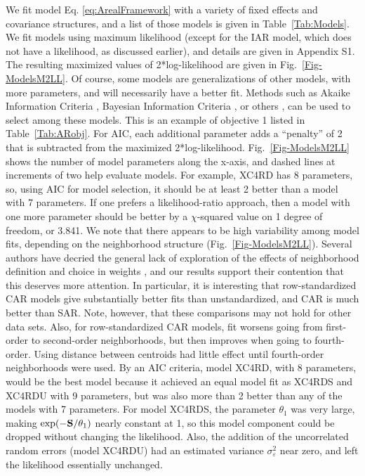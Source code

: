 \documentclass[11pt, titlepage]{article}\usepackage[]{graphicx}\usepackage[]{color}
\begin{document}
\begin{spacing}{1.9}
\begin{flushleft}
We fit model Eq. \ref{eq:ArealFramework} with a variety of fixed effects and covariance structures, and a list of those models is given in Table~\ref{Tab:Models}.  We fit models using maximum likelihood (except for the IAR model, which does not have a likelihood, as discussed earlier), and details are given in Appendix S1. The resulting maximized values of 2*log-likelihood are given in Fig.~\ref{Fig-ModelsM2LL}. Of course, some models are generalizations of other models, with more parameters, and will necessarily have a better fit.  Methods such as Akaike Information Criteria \citep[AIC,][]{Akai:Info:1973}, Bayesian Information Criteria \citep[BIC,][]{Schw:esti:1978}, or others \citep[see, e.g.,][]{Burn:Ande:mode:2002,Hoot:Hobb:guid:2015}, can be used to select among these models. This is an example of objective 1 listed in Table~\ref{Tab:ARobj}. For AIC, each additional parameter adds a ``penalty'' of 2 that is subtracted from the maximized 2*log-likelihood.  Fig.~\ref{Fig-ModelsM2LL} shows the number of model parameters along the x-axis, and dashed lines at increments of two help evaluate models. For example, XC4RD has 8 parameters, so, using AIC for model selection, it should be at least 2 better than a model with 7 parameters.  If one prefers a likelihood-ratio approach, then a model with one more parameter should be better by a $\chi$-squared value on 1 degree of freedom, or 3.841. We note that there appears to be high variability among model fits, depending on the neighborhood structure (Fig.~\ref{Fig-ModelsM2LL}).  Several authors have decried the general lack of exploration of the effects of neighborhood definition and choice in weights \citep{Best:Cock:Benn:Wake:Elli:ecol:2001,Earn:Morg:Meng:Ryan:Summ:Bear:eval:2007}, and our results support their contention that this deserves more attention.  In particular, it is interesting that row-standardized CAR models give substantially better fits than unstandardized, and CAR is much better than SAR.  Note, however, that these comparisons may not hold for other data sets. Also, for row-standardized CAR models, fit worsens going from first-order to second-order neighborhoods, but then improves when going to fourth-order.  Using distance between centroids had little effect until fourth-order neighborhoods were used.  By an AIC criteria, model XC4RD, with 8 parameters, would be the best model because it achieved an equal model fit as XC4RDS and XC4RDU with 9 parameters, but was also more than 2 better than any of the models with 7 parameters. For model XC4RDS, the parameter $\theta_1$ was very large, making $\exp(-\mathbf{S}/\theta_1)$ nearly constant at 1, so this model component could be dropped without changing the likelihood.  Also, the addition of the uncorrelated random errors (model XC4RDU) had an estimated variance $\sigma_\varepsilon^2$ near zero, and left the likelihood essentially unchanged. 


\end{flushleft}
\end{spacing}
\end{document}
